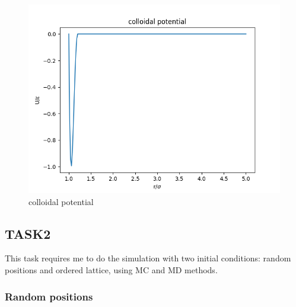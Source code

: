 \documentclass[letterpaper,12pt]{article}
\numberwithin{equation}{section}
\begin{document}
\begin{figure}[H]
    \centering
    \includegraphics[width=.8\textwidth]{phi_C.png}
    \caption{colloidal potential}
\end{figure}

\subsection{TASK2}
This task requires me to do the simulation with two initial conditions: random positions and ordered lattice, using MC and MD methods. 
\subsubsection{Random positions}\label{subsubsec:rand_pos}
\end{document}
